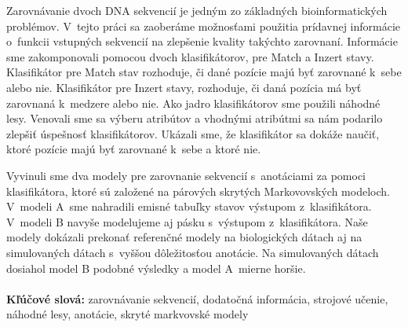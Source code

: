 Zarovnávanie dvoch DNA sekvencií je jedným zo základných
bioinformatických problémov. V~tejto práci sa zaoberáme možnosťami použitia prídavnej informácie o~funkcii vstupných sekvencií na zlepšenie kvality takýchto zarovnaní.
Informácie sme zakomponovali pomocou dvoch klasifikátorov, pre Match a Inzert stavy.
Klasifikátor pre Match stav rozhoduje, či dané pozície majú byť zarovnané k~sebe alebo nie. Klasifikátor pre Inzert stavy, rozhoduje, či daná pozícia má byť zarovnaná k~medzere alebo nie. Ako jadro klasifikátorov sme použili náhodné lesy. Venovali sme sa výberu atribútov a vhodnými atribútmi sa nám podarilo zlepšiť úspešnosť klasifikátorov. Ukázali sme, že klasifikátor sa dokáže naučiť, ktoré pozície majú byť zarovnané k~sebe a ktoré nie.

Vyvinuli sme dva modely pre zarovnanie sekvencií s~anotáciami za pomoci klasifikátora, ktoré sú založené na párových skrytých Markovovských modeloch.
V~modeli A~sme nahradili emisné tabuľky stavov výstupom z~klasifikátora.
V~modeli B navyše modelujeme aj pásku s~výstupom z~klasifikátora.
Naše modely dokázali prekonať referenčné modely na biologických dátach aj na simulovaných dátach s~vyššou dôležitosťou anotácie. Na simulovaných dátach dosiahol model B podobné výsledky a model A~mierne horšie.
\\ \\
{\bf Kľúčové slová:} zarovnávanie sekvencií, dodatočná informácia, strojové učenie, náhodné lesy, anotácie, skryté markvovské modely
